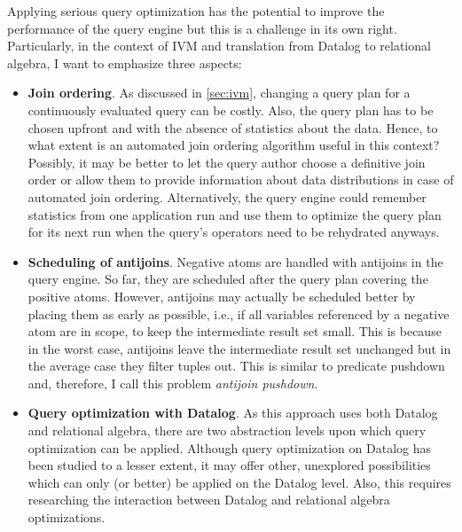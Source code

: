 
Applying serious query optimization has the potential to improve
the performance of the query engine but this is a challenge in its own right.
Particularly, in the context of \ac{IVM} and translation from Datalog to
relational algebra, I want to emphasize three aspects:

\begin{itemize}
    \item \textbf{Join ordering}.
          As discussed in \ref{sec:ivm}, changing a query plan for a continuously
          evaluated query can be costly.
          Also, the query plan has to be chosen upfront and with the absence of
          statistics about the data.
          Hence, to what extent is an automated join ordering algorithm useful
          in this context? Possibly, it may be better to let the query
          author choose a definitive join order or allow them to provide
          information about data distributions in case of automated join ordering.
          Alternatively, the query engine could remember statistics from one
          application run and use them to optimize the query plan for its next
          run when the query's operators need to be rehydrated anyways.
    \item \textbf{Scheduling of antijoins}.
          Negative atoms are handled with antijoins in the query engine.
          So far, they are scheduled after the query plan covering the
          positive atoms.
          However, antijoins may actually be scheduled better by placing them
          as early as possible, i.e., if all variables referenced by a
          negative atom are in scope, to keep the intermediate result set small.
          This is  because in the worst case, antijoins leave the intermediate
          result set unchanged but in the average case they filter tuples out.
          This is similar to predicate pushdown and, therefore, I call this
          problem \emph{antijoin pushdown}.
    \item \textbf{Query optimization with Datalog}.
          As this approach uses both Datalog and relational algebra,
          there are two abstraction levels upon which query optimization
          can be applied.
          Although query optimization on Datalog has been studied
          to a lesser extent, it may offer other, unexplored possibilities
          which can only (or better) be applied on the Datalog level.
          Also, this requires researching the interaction between
          Datalog and relational algebra optimizations.
\end{itemize}

